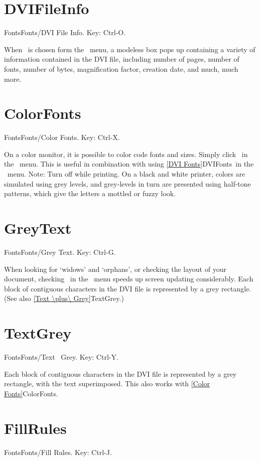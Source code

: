 \newpage

\section{DVIFileInfo}{Fonts}Fonts/DVI File Info. Key: Ctrl-O.

When \ is chosen form the \ menu, a modeless
box pops up containing a variety of information contained in the DVI
file, including number of pages, number of fonts, number of bytes,
magnification factor, creation date, and much, much more.
   \bigskip
   
\section{ColorFonts}{Fonts}Fonts/Color Fonts. Key: Ctrl-X.

On a color monitor, it is possible to color code fonts and sizes.  Simply
click \ in the \ menu.  This is useful in
combination with using \ref{DVI Fonts}{DVIFonts}\ in the
\ menu.
   \medskip
Note: Turn  off while printing.  On a black and white printer,
colors are simulated using grey levels, and grey-levels in turn
are presented using half-tone patterns, which give the letters a 
mottled or fuzzy look.
   \bigskip

\newpage

\section{GreyText}{Fonts}Fonts/Grey Text. Key: Ctrl-G.

When looking for `widows' and `orphans', or checking the layout of your
document, checking \ in the \ menu speeds up
screen updating considerably.  Each block of contiguous characters in the
DVI file is represented by a grey rectangle.
(See also \ref{Text \plus\ Grey}{TextGrey}.)
   \bigskip

\section{TextGrey}{Fonts}Fonts/Text \plus\ Grey.   Key: Ctrl-Y.

Each block of contiguous characters in the DVI file is represented by a grey
rectangle, with the text superimposed.  This also works with
\ref{Color Fonts}{ColorFonts}.
   \bigskip

\section{FillRules}{Fonts}Fonts/Fill Rules. Key: Ctrl-J.

